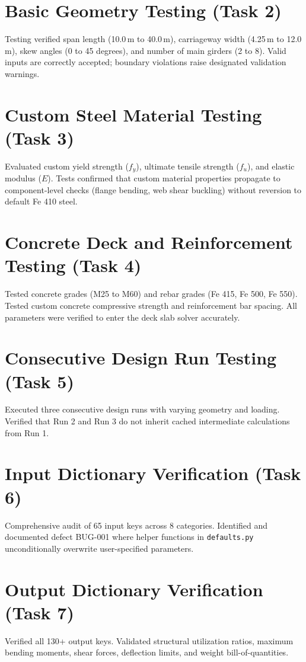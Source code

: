 \documentclass[11pt,a4paper]{report}
\begin{document}
\chapter{Basic Geometry Testing (Task 2)}
Testing verified span length (10.0\,m to 40.0\,m), carriageway width (4.25\,m to 12.0\,m), skew angles (0 to 45 degrees), and number of main girders (2 to 8). Valid inputs are correctly accepted; boundary violations raise designated validation warnings.

\chapter{Custom Steel Material Testing (Task 3)}
Evaluated custom yield strength ($f_y$), ultimate tensile strength ($f_u$), and elastic modulus ($E$). Tests confirmed that custom material properties propagate to component-level checks (flange bending, web shear buckling) without reversion to default Fe 410 steel.

\chapter{Concrete Deck and Reinforcement Testing (Task 4)}
Tested concrete grades (M25 to M60) and rebar grades (Fe 415, Fe 500, Fe 550). Tested custom concrete compressive strength and reinforcement bar spacing. All parameters were verified to enter the deck slab solver accurately.

\chapter{Consecutive Design Run Testing (Task 5)}
Executed three consecutive design runs with varying geometry and loading. Verified that Run 2 and Run 3 do not inherit cached intermediate calculations from Run 1.

\chapter{Input Dictionary Verification (Task 6)}
Comprehensive audit of 65 input keys across 8 categories. Identified and documented defect BUG-001 where helper functions in \texttt{defaults.py} unconditionally overwrite user-specified parameters.

\chapter{Output Dictionary Verification (Task 7)}
Verified all 130+ output keys. Validated structural utilization ratios, maximum bending moments, shear forces, deflection limits, and weight bill-of-quantities.
\end{document}
